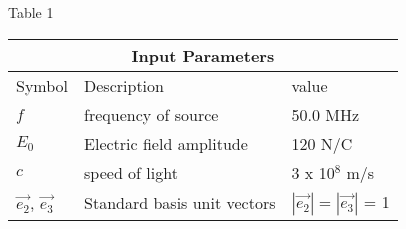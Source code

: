 \setlength{\arrayrulewidth}{0.3mm}
\setlength{\tabcolsep}{15pt}
\renewcommand{\arraystretch}{1.5}

{Table 1}\\

\begin{tabular}{ |p{1cm}|p{1cm}|p{1.7cm}|  }
\hline
\multicolumn{3}{|c|}{Input Parameters} \\
\hline
Symbol& Description&value\\
\hline
$f$ & frequency of source & 50.0 MHz\\
\hline
$E_0$ & Electric field amplitude  & 120 N/C\\
\hline
$c$ &speed of light & 3 x 10$^8$ m/s \\
\hline
$\vec{e_2}$, $\vec{e_3}$ & Standard basis unit vectors & $|\vec{e_2}| = |\vec{e_3}|$ = 1\\
\hline
\end{tabular}
    